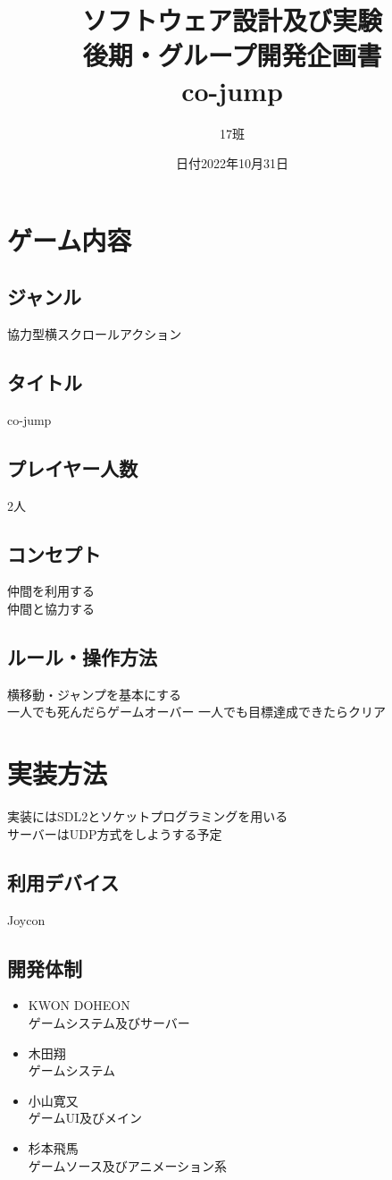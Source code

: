 \documentclass{jsarticle}
\title{ソフトウェア設計及び実験\\後期・グループ開発企画書\\
	\huge{co-jump}
}
\author{17班}
\date{日付2022年10月31日}
\begin{document}
\maketitle

\section{ゲーム内容}
\subsection{ジャンル}
協力型横スクロールアクション

\subsection{タイトル}
co-jump

\subsection{プレイヤー人数}
2人

\subsection{コンセプト}
仲間を利用する\\
仲間と協力する

\subsection{ルール・操作方法}
横移動・ジャンプを基本にする\\
一人でも死んだらゲームオーバー
一人でも目標達成できたらクリア

\section{実装方法}
実装にはSDL2とソケットプログラミングを用いる\\
サーバーはUDP方式をしようする予定

\subsection{利用デバイス}
Joycon

\subsection{開発体制}

\begin{itemize}
	\item KWON DOHEON\\
	ゲームシステム及びサーバー
	\item 木田翔\\
	ゲームシステム
	\item 小山寛又\\
	ゲームUI及びメイン
	\item 杉本飛馬\\
	ゲームソース及びアニメーション系
\end{itemize}
\end{document}
